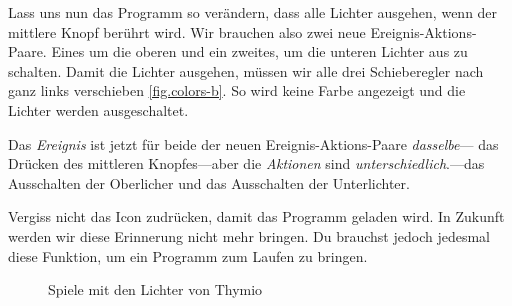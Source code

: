 



Lass uns nun das Programm so verändern, dass alle Lichter ausgehen, wenn der
mittlere Knopf berührt wird. Wir brauchen also zwei neue
Ereignis-Aktions-Paare. Eines um die oberen und ein zweites,
um die unteren Lichter aus zu schalten. Damit die Lichter ausgehen, müssen wir alle drei
Schieberegler nach ganz links verschieben \cref{fig.colors-b}. So wird keine Farbe angezeigt und die Lichter werden ausgeschaltet.

Das \emph{Ereignis} ist jetzt für beide der neuen Ereignis-Aktions-Paare \emph{dasselbe}--- das Drücken des mittleren Knopfes---aber die \emph{Aktionen} sind \emph{unterschiedlich}.---das Ausschalten der Oberlicher und das Ausschalten der Unterlichter.

Vergiss nicht das Icon  zudrücken, damit das Programm geladen wird. In Zukunft werden wir diese Erinnerung nicht mehr bringen. Du brauchst jedoch jedesmal diese Funktion, um ein Programm zum Laufen zu bringen. 

\vfill


\begin{figure}
    \centering
	\hspace{1.5cm}
    \caption{Spiele mit den Lichter von Thymio}
    \label{fig.colors}
\end{figure}